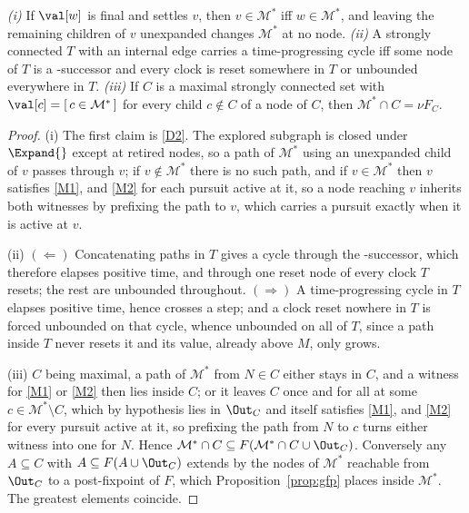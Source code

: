 \begin{lemma}\label{lem:search}
\emph{(i)} If $\val[w]$ is final and settles $v$, then $v\in\mathcal M^{*}$ iff $w\in\mathcal M^{*}$,
and leaving the remaining children of $v$ unexpanded changes $\mathcal M^{*}$ at no node.
\emph{(ii)} A strongly connected $T$ with an internal edge carries a time-progressing cycle iff some
node of $T$ is a -successor and every clock is reset somewhere in $T$ or unbounded
everywhere in $T$.
\emph{(iii)} If $C$ is a maximal strongly connected set with $\val[c]=[\,c\in\mathcal M^{*}\,]$ for
every child $c\notin C$ of a node of $C$, then $\mathcal M^{*}\cap C=\nu F_C$.
\end{lemma}
\begin{proof}
(i) The first claim is \ref{D2}. The explored subgraph is closed under $\Expand{}$ except at retired
nodes, so a path of $\mathcal M^{*}$ using an unexpanded child of $v$ passes through $v$; if
$v\notin\mathcal M^{*}$ there is no such path, and if $v\in\mathcal M^{*}$ then $v$ satisfies
\ref{M1}, and \ref{M2} for each pursuit active at it, so a node reaching $v$ inherits both witnesses
by prefixing the path to $v$, which carries a pursuit exactly when it is active at $v$.

(ii) $(\Leftarrow)$ Concatenating paths in $T$ gives a cycle through the -successor,
which therefore elapses positive time, and through one reset node of every clock $T$ resets; the rest
are unbounded throughout. $(\Rightarrow)$ A time-progressing cycle in $T$ elapses positive time,
hence crosses a  step; and a clock reset nowhere in $T$ is forced unbounded on that
cycle, whence unbounded on all of $T$, since a path inside $T$ never resets it and its value, already
above $M$, only grows.

(iii) $C$ being maximal, a path of $\mathcal M^{*}$ from $N\in C$ either stays in $C$, and a witness
for \ref{M1} or \ref{M2} then lies inside $C$; or it leaves $C$ once and for all at some
$c\in\mathcal M^{*}\setminus C$, which by hypothesis lies in $\Out_C$ and itself satisfies \ref{M1},
and \ref{M2} for every pursuit active at it, so prefixing the path from $N$ to $c$ turns either
witness into one for $N$. Hence $\mathcal M^{*}\cap C\subseteq F(\mathcal M^{*}\cap C\cup\Out_C)$.
Conversely any $A\subseteq C$ with $A\subseteq F(A\cup\Out_C)$ extends by the nodes of
$\mathcal M^{*}$ reachable from $\Out_C$ to a post-fixpoint of $F$, which Proposition~\ref{prop:gfp}
places inside $\mathcal M^{*}$. The greatest elements coincide.
\end{proof}

